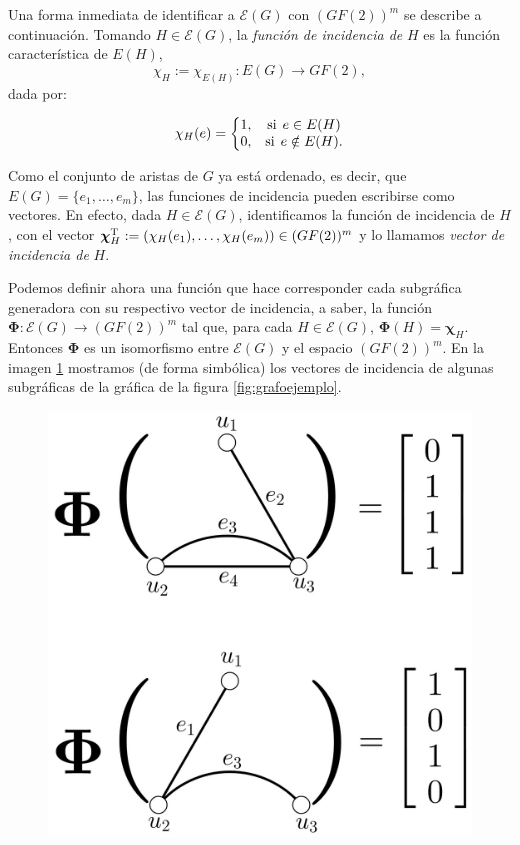 Una forma inmediata de identificar a $\mathcal{E}(G)$ con $(GF(2))^{m}$ se describe a continuación. Tomando $H \in \mathcal{E}(G)$, la \textit{función de incidencia de} $H$ es la función característica de $E(H)$, $$\chi_{H} := \chi_{E(H)} : E(G) \rightarrow GF(2),$$ dada por:

 $$
 \chi_{H}(e) = \left\{\begin{matrix}
1, & \text{si} \hspace{1.5mm} e \in E(H) \\ 
0, & \text{si} \hspace{1.5mm} e\notin E(H).
\end{matrix}\right.
 $$
 
  Como el conjunto de aristas de $G$ ya está ordenado, es decir, que $E(G) = \{e_{1}, \ldots, e_{m}\}$, las funciones de incidencia pueden escribirse como vectores. En efecto, dada $H \in \mathcal{E}(G)$, identificamos la función de incidencia de $H$, con el vector $\boldsymbol{\chi}_{H}^{\textnormal{T}}:= (\chi_{H}(e_{1}), \ldots, \chi_{H}(e_{m})) \in (GF(2))^{m}$ y lo llamamos \textit{vector de incidencia de} $H$.
 
 Podemos definir ahora una función que hace corresponder cada subgráfica generadora con su respectivo vector de incidencia, a saber, la función $\boldsymbol{\Phi} \colon \mathcal{E}(G) \rightarrow (GF(2))^{m}$ tal que, para cada $H \in \mathcal{E}(G)$, $\boldsymbol{\Phi}(H) = \boldsymbol{\chi}_{H}$. Entonces $\boldsymbol{\Phi}$ es un isomorfismo entre $\mathcal{E}(G)$ y el espacio $(GF(2))^{m}$.
 En la imagen \ref{fig:grafovector1} mostramos (de forma simbólica) los vectores de incidencia de algunas subgráficas de la gráfica de la figura \ref{fig:grafoejemplo}.

 \begin{figure}[H]
    \centering
    \includegraphics[scale=0.2]{img/imgchapter3/grafovector1.jpg}
    \caption{}
    \label{fig:grafovector1}
\end{figure}


